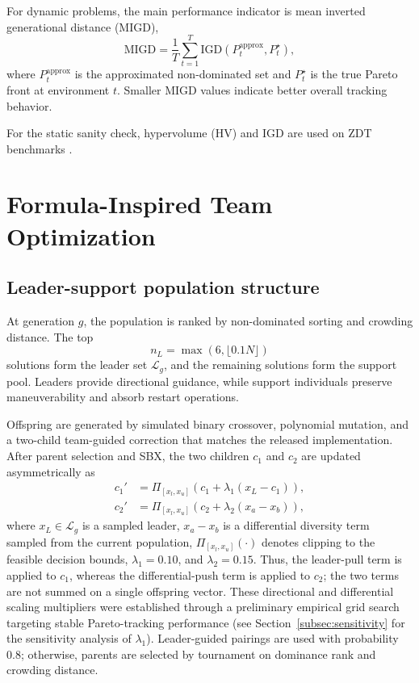\documentclass[preprint,12pt]{elsarticle}
\begin{document}
For dynamic problems, the main performance indicator is mean inverted generational distance (MIGD),
\begin{equation}
\mathrm{MIGD} = \frac{1}{T}\sum_{t=1}^{T}\mathrm{IGD}\left(P_t^{\mathrm{approx}}, P_t^\star\right),
\end{equation}
where $P_t^{\mathrm{approx}}$ is the approximated non-dominated set and $P_t^\star$ is the true Pareto front at environment $t$. Smaller MIGD values indicate better overall tracking behavior.

For the static sanity check, hypervolume (HV) and IGD are used on ZDT benchmarks \cite{Zitzler2000Comparison}.

\section{Formula-Inspired Team Optimization}
\label{sec:method}

\subsection{Leader-support population structure}

At generation $g$, the population is ranked by non-dominated sorting and crowding distance. The top
\begin{equation}
n_L = \max(6,\lfloor 0.1N \rfloor)
\end{equation}
solutions form the leader set $\mathcal{L}_g$, and the remaining solutions form the support pool. Leaders provide directional guidance, while support individuals preserve maneuverability and absorb restart operations.

Offspring are generated by simulated binary crossover, polynomial mutation, and a two-child team-guided correction that matches the released implementation. After parent selection and SBX, the two children $c_1$ and $c_2$ are updated asymmetrically as
\begin{align}
c_1' &= \Pi_{[x_l,x_u]}\left(c_1 + \lambda_1(x_L-c_1)\right), \\
c_2' &= \Pi_{[x_l,x_u]}\left(c_2 + \lambda_2(x_a-x_b)\right),
\label{eq:update}
\end{align}
where $x_L \in \mathcal{L}_g$ is a sampled leader, $x_a-x_b$ is a differential diversity term sampled from the current population, $\Pi_{[x_l,x_u]}(\cdot)$ denotes clipping to the feasible decision bounds, $\lambda_1=0.10$, and $\lambda_2=0.15$. Thus, the leader-pull term is applied to $c_1$, whereas the differential-push term is applied to $c_2$; the two terms are not summed on a single offspring vector. These directional and differential scaling multipliers were established through a preliminary empirical grid search targeting stable Pareto-tracking performance (see Section~\ref{subsec:sensitivity} for the sensitivity analysis of $\lambda_1$). Leader-guided pairings are used with probability 0.8; otherwise, parents are selected by tournament on dominance rank and crowding distance.
\end{document}
